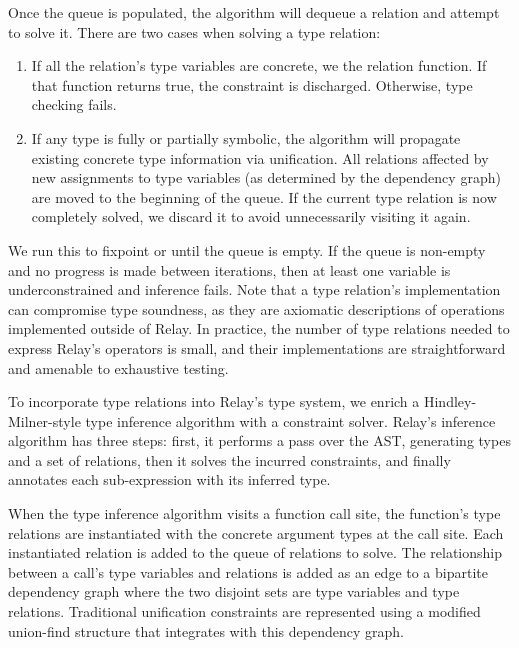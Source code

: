 Once the queue is populated, the algorithm will dequeue a relation and attempt to solve it.
There are two cases when solving a type relation:
\begin{enumerate}
\item If all the relation's type variables
are concrete, we the relation function. If that function returns true, the
constraint is discharged. Otherwise, type checking fails.
\item If any type is fully or partially symbolic, the
  algorithm will propagate
  existing concrete type information via unification.
All relations affected by new assignments to type
  variables (as determined by the dependency graph)
  are moved to the beginning of the queue.
If the current type relation is now completely solved, we
discard it to avoid unnecessarily visiting it again.
\end{enumerate}

We run this to fixpoint or until the queue is empty.
If the queue is non-empty and no progress is made between iterations,
then at least one variable is underconstrained and inference fails.
Note that a type relation's implementation can
compromise type soundness, as they are axiomatic descriptions
of operations implemented outside of Relay.
In practice, the number of type relations needed to express Relay's
operators is small, and their implementations are straightforward
and amenable to exhaustive testing.

To incorporate type relations into Relay's type system, we enrich
  a Hindley-Milner-style type inference algorithm with
  a constraint solver.
Relay's inference algorithm has three steps: first, it
  performs a pass over the AST, generating types and a set of relations,
  then it solves the incurred constraints,
  and finally annotates each sub-expression with its inferred type.


When the type inference algorithm visits a function call site, the function's type relations are
  instantiated with the concrete argument types at the call site.
Each instantiated relation is added to the queue of relations to solve.
The relationship between a call's type variables and relations is added as an edge to
  a bipartite dependency graph where the two disjoint sets are type variables and type relations.
Traditional unification constraints are represented using a modified union-find structure that
  integrates with this dependency graph.


